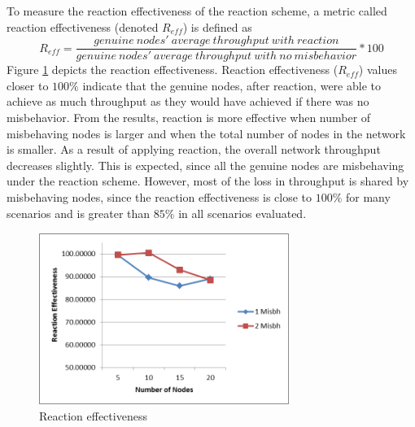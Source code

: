 \documentclass[12pt,letterpaper,english]{article}
\begin{document}
To measure the reaction effectiveness of the reaction scheme, a metric called reaction effectiveness (denoted $R_{eff}$) is defined as 
\begin{equation}
\label{equation:reaction_effectiveness}
R_{eff} = \frac{genuine\ nodes'\ average\ throughput\ with\ reaction}{genuine\ nodes'\ average\ throughput\ with\ no\ misbehavior} * 100
\end{equation}
Figure \ref{figure:reaction_effectiveness} depicts the reaction effectiveness. 
Reaction effectiveness ($R_{eff}$) values closer to $100\%$ indicate that the genuine nodes, after reaction, were able to achieve as much throughput as they would have achieved if there was no misbehavior. From the results, reaction is more effective when number of misbehaving nodes is larger and when the total number of nodes in the network is smaller. As a result of applying reaction, the overall network throughput decreases slightly. This is expected, since all the genuine nodes are misbehaving under the reaction scheme. However, most of the loss in throughput is shared by misbehaving nodes, since the reaction effectiveness is close to $100\%$ for many scenarios and is greater than $85\%$ in all scenarios evaluated.
\begin{figure}
\centering
\includegraphics[width=3.2in,height=2.2in]{figures/reaction_effectiveness.png}
\caption{Reaction effectiveness}
\label{figure:reaction_effectiveness}
\end{figure}
\end{document}

